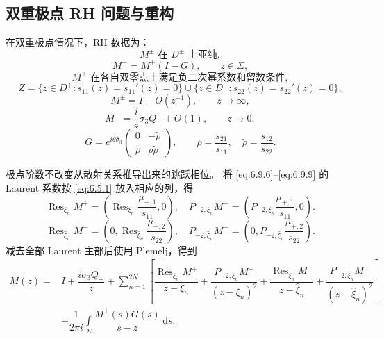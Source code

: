 \documentclass[lang=cn,scheme=chinese,mode=simple,device=normal,color=blue,
math=cm,thmcnt=section,12pt]{elegantbook}
\DeclareMathOperator*{\Res}{Res}
\newcommand{\dd}{\,\mathrm{d}}
\newcommand{\eqq}[2]{\tag{#1}\label{eq:#1}#2}
\begin{document}
\subsection{双重极点 RH 问题与重构}
\setcounter{theorem}{3}
\begin{theorem}[双重极点的广义 RH 问题]
    在双重极点情况下，RH 数据为：
    \begin{equation}\eqq{6.9.10}{M^\pm\text{ 在 }D^\pm\text{ 上亚纯},}\end{equation}
    \begin{equation}\eqq{6.9.11}{M^-=M^+(I-G),\qquad z\in\Sigma,}\end{equation}
    \begin{equation}\eqq{6.9.12}{M^\pm\text{ 在各自双零点上满足负二次幂系数和留数条件},}\end{equation}
    \begin{equation}\eqq{6.9.13}{Z=\{z\in D^+:s_{11}(z)=s_{11}'(z)=0\}
            \cup\{z\in D^-:s_{22}(z)=s_{22}'(z)=0\},}\end{equation}
    \begin{equation}\eqq{6.9.14}{M^\pm=I+O(z^{-1}),\qquad z\to\infty,}\end{equation}
    \begin{equation}\eqq{6.9.15}{M^\pm=\dfrac{i}{z}\sigma_3Q_-+O(1),\qquad z\to0,}\end{equation}
    \begin{equation}\eqq{6.9.16}{G=e^{i\theta\widehat\sigma_3}
            \begin{pmatrix}0&-\widetilde\rho\\\rho&\rho\widetilde\rho\end{pmatrix},
            \qquad \rho=\dfrac{s_{21}}{s_{11}},\quad\widetilde\rho=\dfrac{s_{12}}{s_{22}}.}\end{equation}
\end{theorem}
极点阶数不改变从散射关系推导出来的跳跃相位。
将 \eqref{eq:6.9.6}--\eqref{eq:6.9.9} 的 Laurent 系数按 \eqref{eq:6.5.1} 放入相应的列，得
\begin{equation}\eqq{6.9.17}{\Res_{\xi_n}M^+=\left(\Res_{\xi_n}\dfrac{\mu_{+,1}}{s_{11}},0\right),\quad
        P_{-2,\xi_n}M^+=\left(P_{-2,\xi_n}\dfrac{\mu_{+,1}}{s_{11}},0\right).}\end{equation}
\begin{equation}\eqq{6.9.18}{\Res_{\widehat\xi_n}M^-=\left(0,\Res_{\widehat\xi_n}\dfrac{\mu_{+,2}}{s_{22}}\right),\quad
        P_{-2,\widehat\xi_n}M^-=\left(0,P_{-2,\widehat\xi_n}\dfrac{\mu_{+,2}}{s_{22}}\right).}\end{equation}
减去全部 Laurent 主部后使用 Plemelj，得到
\begin{equation}
    \eqq{6.9.19}{\begin{aligned}
            M(z)={} & I+\dfrac{i\sigma_3Q_-}{z}
            +\sum\limits_{n=1}^{2N}\left[
                \dfrac{\Res_{\xi_n}M^+}{z-\xi_n}+\dfrac{P_{-2,\xi_n}M^+}{(z-\xi_n)^2}
            +\dfrac{\Res_{\widehat\xi_n}M^-}{z-\widehat\xi_n}+\dfrac{P_{-2,\widehat\xi_n}M^-}{(z-\widehat\xi_n)^2}\right] \\
                    & +\dfrac{1}{2\pi i}\int\limits_\Sigma\dfrac{M^+(s)G(s)}{s-z}\dd s.
        \end{aligned}}
\end{equation}
\end{document}
